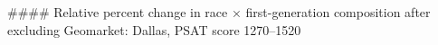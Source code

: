 #### Relative percent change in race × first-generation composition after excluding Geomarket: Dallas, PSAT score 1270–1520

